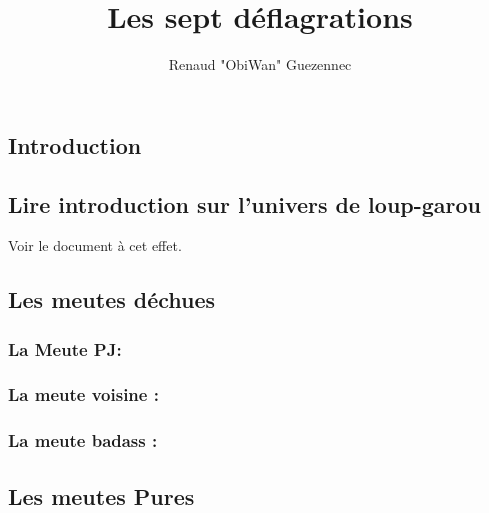 \documentclass[oneside,12pt]{book}
\title{Les sept déflagrations}
\author{Renaud "ObiWan" Guezennec}
\date{}
\begin{document}
\maketitle \clearpage
\tableofcontents \clearpage

\begin{flushleft}
    \chapter{Introduction}
        \section{Lire introduction sur l'univers de loup-garou}
       Voir le document à cet effet. 
         
\section{Les meutes déchues}
\subsection{La Meute PJ: }

\subsection{La meute voisine :}

\subsection{La meute badass :}

\section{Les meutes Pures}

\subsection{}

\clearpage

\end{flushleft}
\end{document}
